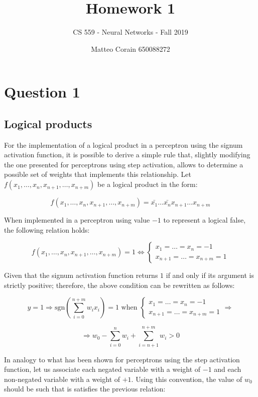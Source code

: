\documentclass[letterpaper,headings=standardclasses]{scrartcl}
\title{Homework 1}
\subtitle{CS 559 - Neural Networks - Fall 2019}
\author{Matteo Corain 650088272}
\begin{document}
\maketitle

\section{Question 1}

\subsection{Logical products}

For the implementation of a logical product in a perceptron using the signum activation function, it is possible to derive a simple rule that, slightly modifying the one presented for perceptrons using step activation, allows to determine a possible set of weights that implements this relationship. Let $f(x_1, \dots, x_n, x_{n+1}, \dots, x_{n+m})$ be a logical product in the form:

$$ f(x_1, \dots, x_n, x_{n+1}, \dots, x_{n+m}) = \bar{x_1} \dots \bar{x_n} x_{n+1} \dots x_{n+m} $$

When implemented in a perceptron using value $-1$ to represent a logical false, the following relation holds:

$$ f(x_1, \dots, x_n, x_{n+1}, \dots, x_{n+m}) = 1 \Leftrightarrow \begin{cases} x_1 = \dots = x_n = -1 \\ x_{n+1} = \dots = x_{n+m} = 1\end{cases}$$

Given that the signum activation function returns $1$ if and only if its argument is strictly positive; therefore, the above condition can be rewritten as follows:

$$ y = 1 \Rightarrow \text{sgn} \left( \sum_{i=0}^{n+m} w_i x_i \right) = 1 \text{ when } \begin{cases} x_1 = \dots = x_n = -1 \\ x_{n+1} = \dots = x_{n+m} = 1\end{cases} \Rightarrow$$

$$ \Rightarrow w_0 - \sum_{i = 0}^{n} w_i + \sum_{i = n+1}^{n+m} w_i > 0 $$

In analogy to what has been shown for perceptrons using the step activation function, let us associate each negated variable with a weight of $-1$ and each non-negated variable with a weight of $+1$. Using this convention, the value of $w_0$ should be such that is satisfies the previous relation:
\end{document}
